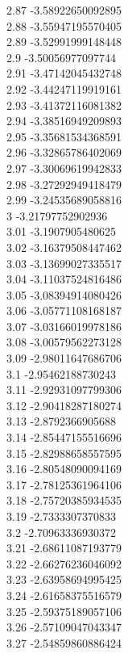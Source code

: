 {2.87	-3.58922650092895\\
2.88	-3.55947195570405\\
2.89	-3.52991999148448\\
2.9	-3.50056977097744\\
2.91	-3.47142045432748\\
2.92	-3.44247119919161\\
2.93	-3.41372116081382\\
2.94	-3.38516949209893\\
2.95	-3.35681534368591\\
2.96	-3.32865786402069\\
2.97	-3.30069619942833\\
2.98	-3.27292949418479\\
2.99	-3.24535689058816\\
3	-3.21797752902936\\
3.01	-3.1907905480625\\
3.02	-3.16379508447462\\
3.03	-3.13699027335517\\
3.04	-3.11037524816486\\
3.05	-3.08394914080426\\
3.06	-3.05771108168187\\
3.07	-3.03166019978186\\
3.08	-3.00579562273128\\
3.09	-2.98011647686706\\
3.1	-2.95462188730243\\
3.11	-2.92931097799306\\
3.12	-2.90418287180274\\
3.13	-2.8792366905688\\
3.14	-2.85447155516696\\
3.15	-2.82988658557595\\
3.16	-2.80548090094169\\
3.17	-2.78125361964106\\
3.18	-2.75720385934535\\
3.19	-2.7333307370833\\
3.2	-2.70963336930372\\
3.21	-2.68611087193779\\
3.22	-2.66276236046092\\
3.23	-2.63958694995425\\
3.24	-2.61658375516579\\
3.25	-2.59375189057106\\
3.26	-2.57109047043347\\
3.27	-2.54859860886424\\
}
